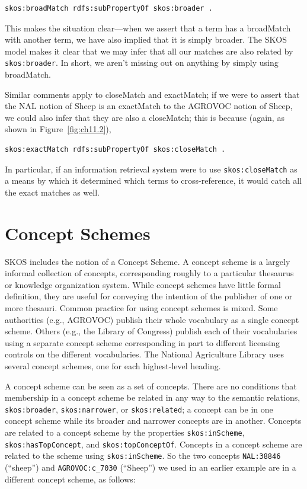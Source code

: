 \begin{lstlisting}
skos:broadMatch rdfs:subPropertyOf skos:broader .
\end{lstlisting}

This makes the situation clear---when we assert that a term has a
broadMatch with another term, we have also implied that it is simply
broader. The SKOS model makes it clear that we may infer that all our
matches are also related by \texttt{skos:broader}. In short, we aren't missing
out on anything by simply using broadMatch.

Similar comments apply to closeMatch and exactMatch; if we were to
assert that the NAL
notion of Sheep is an exactMatch to the AGROVOC notion of Sheep, we
could also infer that they are also a closeMatch; this is because
(again, as shown in Figure~\ref{fig:ch11.2}),

\begin{lstlisting}
skos:exactMatch rdfs:subPropertyOf skos:closeMatch .
\end{lstlisting}

In particular, if an information retrieval system were to use
\texttt{skos:closeMatch} as a means by which it determined which terms to
cross-reference, it would catch all the exact matches as well.

\section{Concept Schemes}

SKOS includes the notion of a Concept Scheme. A concept scheme is a
largely informal collection of concepts, corresponding roughly to a
particular thesaurus or knowledge organization system. While concept
schemes have little formal definition, they are useful for conveying the
intention of the publisher of one or more thesauri. Common practice for
using concept schemes is mixed. Some authorities (e.g., AGROVOC) publish
their whole vocabulary as a single concept scheme. Others (e.g., the
Library of Congress) publish each of their vocabularies using a separate
concept scheme
corresponding in part to different licensing controls on the different
vocabularies. The National
Agriculture Library uses several concept schemes, one for each
highest-level heading.

A concept scheme can be seen as a set of concepts. There are no
conditions that membership in a concept scheme be related in any way to
the semantic relations, \texttt{skos:broader}, \texttt{skos:narrower}, or \texttt{skos:related}; a
concept can be in one concept scheme while its broader and narrower
concepts are in another. Concepts are related to a concept scheme by the
properties \texttt{skos:inScheme}, \texttt{skos:hasTopConcept}, and \texttt{skos:topConceptOf}.
Concepts in a concept scheme are related to the scheme using
\texttt{skos:inScheme}. So the two
concepts \texttt{NAL:38846} (``sheep'') and \texttt{AGROVOC:c\_7030} (``Sheep'') we used
in an earlier example are in a different concept scheme, as follows:

